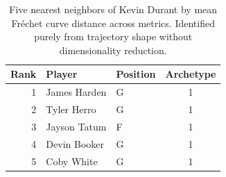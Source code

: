 \begin{table}[htbp]
  \centering\small
  \begin{tabular}{rllc}
    \toprule
    Rank & Player & Position & Archetype \\
    \midrule
    1 & James Harden & G & 1 \\
    2 & Tyler Herro & G & 1 \\
    3 & Jayson Tatum & F & 1 \\
    4 & Devin Booker & G & 1 \\
    5 & Coby White & G & 1 \\
    \bottomrule
  \end{tabular}
  \caption{Five nearest neighbors of Kevin Durant by mean Fr\'{e}chet curve distance across metrics. Identified purely from trajectory shape without dimensionality reduction.}
  \label{tab:Kevin_Durant_frechet_curve_neighbors}
\end{table}

